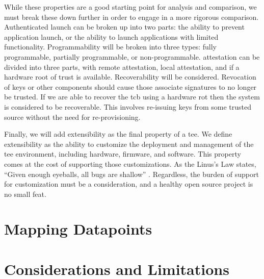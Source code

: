 While these properties are a good starting point for analysis and comparison, we must break these down further in order to engage in a more rigorous comparison. Authenticated launch can be broken up into two parts: the ability to prevent application launch, or the ability to launch applications with limited functionality. Programmability will be broken into three types: fully programmable, partially programmable, or non-programmable. \Gls{attestation} can be divided into three parts, with remote attestation, local attestation, and if a hardware root of trust is available. Recoverability will be considered. Revocation of keys or other components should cause those associate signatures to no longer be trusted. If we are able to recover the \gls{tcb} using a hardware \gls{rot} then the system is considered to be recoverable. This involves re-issuing keys from some trusted source without the need for re-provisioning.

Finally, we will add extensibility as the final property of a \gls{tee}. We define extensibility as the ability to customize the deployment and management of the \gls{tee} environment, including hardware, firmware, and software. This property comes at the cost of supporting those customizations. As the Linus's Law states, ``Given enough eyeballs, all bugs are shallow'' \cite{raymond1999cathedral}. Regardless, the burden of support for customization must be a consideration, and a healthy open source project is no small feat.

\section{Mapping Datapoints}

\renewcommand{\arraystretch}{1}


\section{Considerations and Limitations}
